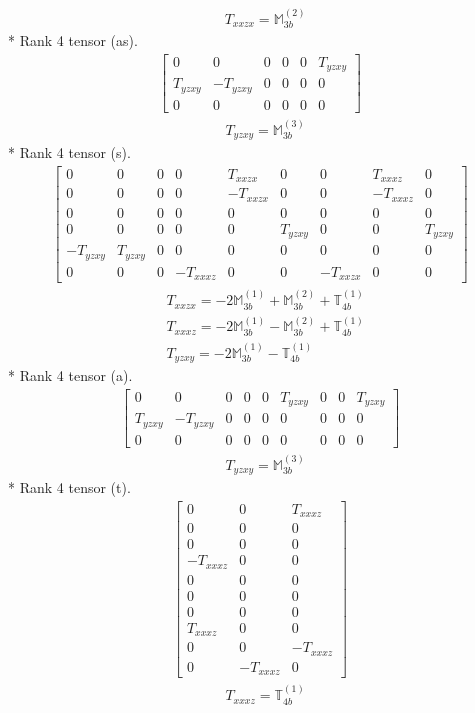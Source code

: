 \documentclass[fleqn,8pt,landscape]{jsarticle}
\begin{document}
\begin{align*}
& T_{xxzx} = \mathbb{M}_{3b}^{(2)}
\end{align*}
* Rank 4 tensor (as).
\begin{align*}
\begin{bmatrix} 0 & 0 & 0 & 0 & 0 & T_{yzxy} \\ T_{yzxy} & - T_{yzxy} & 0 & 0 & 0 & 0 \\ 0 & 0 & 0 & 0 & 0 & 0 \end{bmatrix}
\end{align*}
\begin{align*}
& T_{yzxy} = \mathbb{M}_{3b}^{(3)}
\end{align*}
* Rank 4 tensor (s).
\begin{align*}
\begin{bmatrix} 0 & 0 & 0 & 0 & T_{xxzx} & 0 & 0 & T_{xxxz} & 0 \\ 0 & 0 & 0 & 0 & - T_{xxzx} & 0 & 0 & - T_{xxxz} & 0 \\ 0 & 0 & 0 & 0 & 0 & 0 & 0 & 0 & 0 \\ 0 & 0 & 0 & 0 & 0 & T_{yzxy} & 0 & 0 & T_{yzxy} \\ - T_{yzxy} & T_{yzxy} & 0 & 0 & 0 & 0 & 0 & 0 & 0 \\ 0 & 0 & 0 & - T_{xxxz} & 0 & 0 & - T_{xxzx} & 0 & 0 \end{bmatrix}
\end{align*}
\begin{align*}
& T_{xxzx} = - 2 \mathbb{M}_{3b}^{(1)} + \mathbb{M}_{3b}^{(2)} + \mathbb{T}_{4b}^{(1)} \\
& T_{xxxz} = - 2 \mathbb{M}_{3b}^{(1)} - \mathbb{M}_{3b}^{(2)} + \mathbb{T}_{4b}^{(1)} \\
& T_{yzxy} = - 2 \mathbb{M}_{3b}^{(1)} - \mathbb{T}_{4b}^{(1)}
\end{align*}
* Rank 4 tensor (a).
\begin{align*}
\begin{bmatrix} 0 & 0 & 0 & 0 & 0 & T_{yzxy} & 0 & 0 & T_{yzxy} \\ T_{yzxy} & - T_{yzxy} & 0 & 0 & 0 & 0 & 0 & 0 & 0 \\ 0 & 0 & 0 & 0 & 0 & 0 & 0 & 0 & 0 \end{bmatrix}
\end{align*}
\begin{align*}
& T_{yzxy} = \mathbb{M}_{3b}^{(3)}
\end{align*}
* Rank 4 tensor (t).
\begin{align*}
\begin{bmatrix} 0 & 0 & T_{xxxz} \\ 0 & 0 & 0 \\ 0 & 0 & 0 \\ - T_{xxxz} & 0 & 0 \\ 0 & 0 & 0 \\ 0 & 0 & 0 \\ 0 & 0 & 0 \\ T_{xxxz} & 0 & 0 \\ 0 & 0 & - T_{xxxz} \\ 0 & - T_{xxxz} & 0 \end{bmatrix}
\end{align*}
\begin{align*}
& T_{xxxz} = \mathbb{T}_{4b}^{(1)}
\end{align*}
\end{document}
